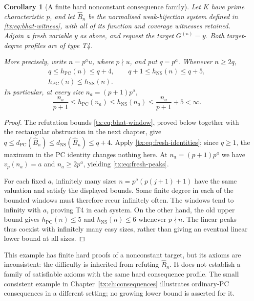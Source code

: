 \documentclass[11pt,a4paper,oneside,openany]{book}
\newtheorem{corollary}[theorem]{Corollary}
\theoremstyle{definition}\newtheorem{definition}[theorem]{Definition}
\theoremstyle{remark}\newtheorem{remark}[theorem]{Remark}
\newcommand{\NS}{\mathrm{NS}}\newcommand{\PC}{\mathrm{PC}}
\numberwithin{equation}{chapter}
\begin{document}
\begin{corollary}[A finite hard nonconstant consequence family]\label{tx:cor:fresh-peaks}
Let $K$ have prime characteristic $p$, and let $\widehat B_n$ be the
normalised weak-bijection system defined in
\eqref{tx:eq:bhat-witness}, with all of its function and coverage witnesses
retained. Adjoin a fresh variable $y$ as above, and request the target
$G^{(n)}=y$. Both target-degree profiles are of type T4.

More precisely, write $n=p^a u$, where $p\nmid u$, and put $q=p^a$.
Whenever $n\ge2q$,
\[
 \begin{gathered}
 q\le h_{\PC}(n)\le q+4,\qquad
 q+1\le h_{\NS}(n)\le q+5,\\
                         h_{\PC}(n)\le h_{\NS}(n).
 \end{gathered}
\]
In particular, at every size $n_a=(p+1)p^a$,
\begin{equation}\label{tx:eq:fresh-peaks}
 \frac{n_a}{p+1}\le h_{\PC}(n_a)\le h_{\NS}(n_a)
                              \le\frac{n_a}{p+1}+5<\infty.
\end{equation}
\end{corollary}
\begin{proof}
The refutation bounds \eqref{tx:eq:bhat-window}, proved below together with the rectangular obstruction in the next
chapter, give
$q\le d_{\PC}(\widehat B_n)\le d_{\NS}(\widehat B_n)\le q+4$.
Apply \eqref{tx:eq:fresh-identities}; since $q\ge1$, the maximum in the
PC identity changes nothing here. At $n_a=(p+1)p^a$ we have
$v_p(n_a)=a$ and $n_a\ge2p^a$, yielding \eqref{tx:eq:fresh-peaks}.

For each fixed $a$, infinitely many sizes
$n=p^a(p(j+1)+1)$ have the same valuation and satisfy the displayed
bounds. Some finite degree in each of the bounded windows must
therefore recur infinitely often. The windows tend to infinity with
$a$, proving T4 in each system. On the other hand, the old upper
bound gives $h_{\PC}(n)\le5$ and $h_{\NS}(n)\le6$ whenever
$p\nmid n$. The linear peaks thus coexist with infinitely many easy
sizes, rather than giving an eventual linear lower bound at all sizes.
\end{proof}

This example has finite hard proofs of a nonconstant target, but its
axioms are inconsistent: the difficulty is inherited from refuting
$\widehat B_n$. It does not establish a family of satisfiable axioms
with the same hard consequence profile. The small consistent example
in Chapter~\ref{tx:ch:consequences} illustrates ordinary-PC consequences in
a different setting; no growing lower bound is asserted for it.
\end{document}
